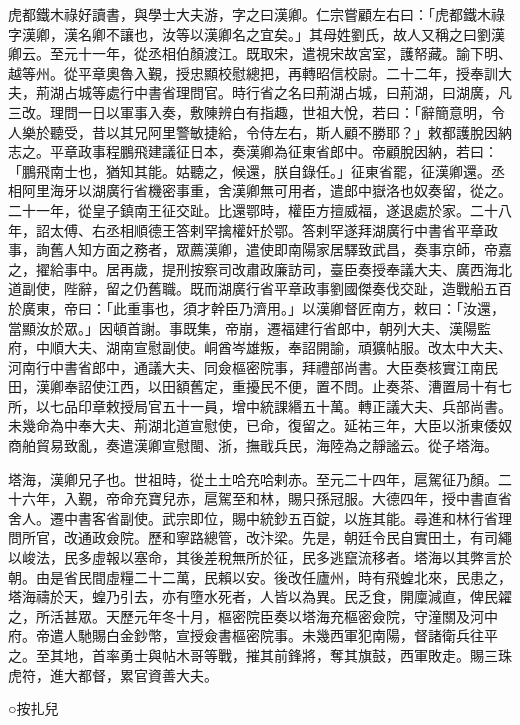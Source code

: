 \begin{pinyinscope}
 虎都鐵木祿好讀書，與學士大夫游，字之曰漢卿。仁宗嘗顧左右曰：「虎都鐵木祿字漢卿，漢名卿不讓也，汝等以漢卿名之宜矣。」其母姓劉氏，故人又稱之曰劉漢卿云。至元十一年，從丞相伯顏渡江。既取宋，遣視宋故宮室，護帑藏。諭下明、越等州。從平章奧魯入覲，授忠顯校慰總把，再轉昭信校尉。二十二年，授奉訓大夫，荊湖占城等處行中書省理問官。時行省之名曰荊湖占城，曰荊湖，曰湖廣，凡三改。理問一日以軍事入奏，敷陳辨白有指趣，世祖大悅，若曰：「辭簡意明，令人樂於聽受，昔以其兄阿里警敏捷給，令侍左右，斯人顧不勝耶？」敕都護脫因納志之。平章政事程鵬飛建議征日本，奏漢卿為征東省郎中。帝顧脫因納，若曰：「鵬飛南士也，猶知其能。姑聽之，候還，朕自錄任。」征東省罷，征漢卿還。丞相阿里海牙以湖廣行省機密事重，舍漢卿無可用者，遣郎中嶽洛也奴奏留，從之。二十一年，從皇子鎮南王征交趾。比還鄂時，權臣方擅威福，遂退處於家。二十八年，詔太傅、右丞相順德王答剌罕擒權奸於鄂。答剌罕遂拜湖廣行中書省平章政事，詢舊人知方面之務者，眾薦漢卿，遣使即南陽家居驛致武昌，奏事京師，帝嘉之，擢給事中。居再歲，提刑按察司改肅政廉訪司，臺臣奏授奉議大夫、廣西海北道副使，陛辭，留之仍舊職。既而湖廣行省平章政事劉國傑奏伐交趾，造戰船五百於廣東，帝曰：「此重事也，須才幹臣乃濟用。」以漢卿督匠南方，敕曰：「汝還，當顯汝於眾。」因頓首謝。事既集，帝崩，遷福建行省郎中，朝列大夫、漢陽監府，中順大夫、湖南宣慰副使。峒酋岑雄叛，奉詔開諭，頑獷帖服。改太中大夫、河南行中書省郎中，通議大夫、同僉樞密院事，拜禮部尚書。大臣奏核實江南民田，漢卿奉詔使江西，以田額舊定，重擾民不便，置不問。止奏茶、漕置局十有七所，以七品印章敕授局官五十一員，增中統課緡五十萬。轉正議大夫、兵部尚書。未幾命為中奉大夫、荊湖北道宣慰使，已命，復留之。延祐三年，大臣以浙東倭奴商舶貿易致亂，奏遣漢卿宣慰閩、浙，撫戢兵民，海陸為之靜謐云。從子塔海。



 塔海，漢卿兄子也。世祖時，從土土哈充哈剌赤。至元二十四年，扈駕征乃顏。二十六年，入覲，帝命充寶兒赤，扈駕至和林，賜只孫冠服。大德四年，授中書直省舍人。遷中書客省副使。武宗即位，賜中統鈔五百錠，以旌其能。尋進和林行省理問所官，改通政僉院。歷和寧路總管，改汴梁。先是，朝廷令民自實田土，有司繩以峻法，民多虛報以塞命，其後差稅無所於征，民多逃竄流移者。塔海以其弊言於朝。由是省民間虛糧二十二萬，民賴以安。後改任廬州，時有飛蝗北來，民患之，塔海禱於天，蝗乃引去，亦有墮水死者，人皆以為異。民乏食，開廩減直，俾民糴之，所活甚眾。天歷元年冬十月，樞密院臣奏以塔海充樞密僉院，守潼關及河中府。帝遣人馳賜白金鈔幣，宣授僉書樞密院事。未幾西軍犯南陽，督諸衛兵往平之。至其地，首率勇士與帖木哥等戰，摧其前鋒將，奪其旗鼓，西軍敗走。賜三珠虎符，進大都督，累官資善大夫。



 ○按扎兒




\end{pinyinscope}
